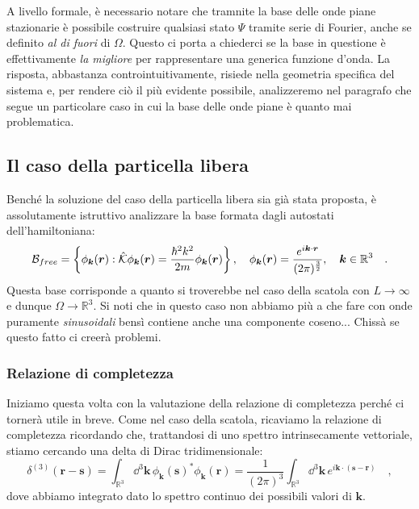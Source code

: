 A livello formale, è necessario notare che tramnite la base delle onde piane stazionarie è possibile costruire qualsiasi stato $\Psi$ tramite serie di Fourier, anche se definito \emph{al di fuori} di $\Omega$. Questo ci porta a chiederci se la base in questione è effettivamente \emph{la migliore} per rappresentare una generica funzione d'onda. La risposta, abbastanza controintuitivamente, risiede nella geometria specifica del sistema e, per rendere ciò il più evidente possibile, analizzeremo nel paragrafo che segue un particolare caso in cui la base delle onde piane è quanto mai problematica. 

\subsection{Il caso della particella libera}
Benché la soluzione del caso della particella libera sia già stata proposta, è assolutamente istruttivo analizzare la base formata dagli autostati dell'hamiltoniana:
\[
    \mathcal{B}_{free} = \left\{ \phi_{\bm{k}}(\bm{r}) : \hat{\mathcal{K}}\phi_{\bm{k}}(\bm{r}) = \frac{\hbar^2k^2}{2m} \phi_{\bm{k}}(\bm{r}) \right\}, \quad \phi_{\bm{k}}(\bm{r}) = \frac{e^{i\bm{k}\cdot \bm{r}}}{(2\pi)^{\frac{3}{2}}}, \quad \bm{k} \in \mathbb{R}^3 \quad.
\]
Questa base corrisponde a quanto si troverebbe nel caso della scatola con $L \to \infty$ e dunque $\Omega \to \mathbb{R}^3$. Si noti che in questo caso non abbiamo più a che fare con onde puramente \emph{sinusoidali} bensì contiene anche una componente coseno... Chissà se questo fatto ci creerà problemi.

\subsubsection{Relazione di completezza}
Iniziamo questa volta con la valutazione della relazione di completezza perché ci tornerà utile in breve. Come nel caso della scatola, ricaviamo la relazione di completezza ricordando che, trattandosi di uno spettro intrinsecamente vettoriale, stiamo cercando una delta di Dirac tridimensionale:
\begin{equation}
        \delta^{(3)}(\bm{r}-\bm{s}) = \int_{\mathbb{R}^3} \dd^3{\bm{k}} \, \phi_{\bm{k}}(\bm{s})^* \phi_{\bm{k}}(\bm{r}) = \frac{1}{(2\pi)^{3}} \int_{\mathbb{R}^3} \dd^3{\bm{k}} \, e^{i\bm{k}\cdot (\bm{s}-\bm{r})} \quad,
        \label{eq:com_rel}
\end{equation} 
dove abbiamo integrato dato lo spettro continuo dei possibili valori di $\bm{k}$.

